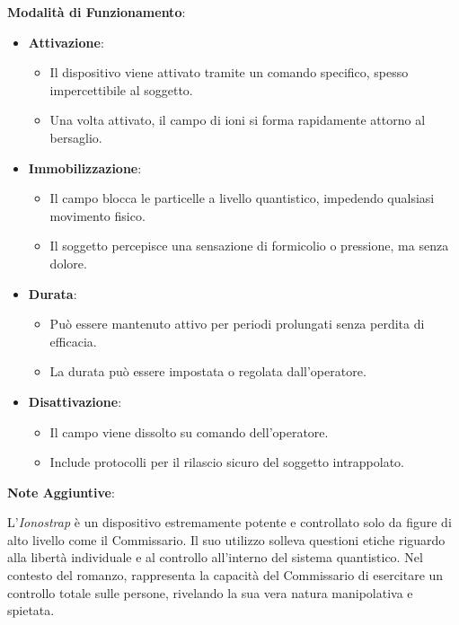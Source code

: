 \begin{tcolorbox}[fontupper=\tiny, fontlower=\Large,colback=white,colframe=black,title=\textbf{Ionostrap}]
\begin{multicols}{2}
\textbf{Modalità di Funzionamento}:

\begin{itemize}
    \item \textbf{Attivazione}:
    \begin{itemize}
        \item Il dispositivo viene attivato tramite un comando specifico, spesso impercettibile al soggetto.
        \item Una volta attivato, il campo di ioni si forma rapidamente attorno al bersaglio.
    \end{itemize}
    \item \textbf{Immobilizzazione}:
    \begin{itemize}
        \item Il campo blocca le particelle a livello quantistico, impedendo qualsiasi movimento fisico.
        \item Il soggetto percepisce una sensazione di formicolio o pressione, ma senza dolore.
    \end{itemize}
    \item \textbf{Durata}:
    \begin{itemize}
        \item Può essere mantenuto attivo per periodi prolungati senza perdita di efficacia.
        \item La durata può essere impostata o regolata dall'operatore.
    \end{itemize}
    \item \textbf{Disattivazione}:
    \begin{itemize}
        \item Il campo viene dissolto su comando dell'operatore.
        \item Include protocolli per il rilascio sicuro del soggetto intrappolato.
    \end{itemize}
\end{itemize}

\textbf{Note Aggiuntive}:

L'\emph{Ionostrap} è un dispositivo estremamente potente e controllato solo da figure di alto livello come il Commissario. Il suo utilizzo solleva questioni etiche riguardo alla libertà individuale e al controllo all'interno del sistema quantistico. Nel contesto del romanzo, rappresenta la capacità del Commissario di esercitare un controllo totale sulle persone, rivelando la sua vera natura manipolativa e spietata.

\end{multicols}
\end{tcolorbox}

